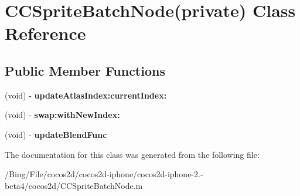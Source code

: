 \hypertarget{interface_c_c_sprite_batch_node_07private_08}{\section{C\-C\-Sprite\-Batch\-Node(private) Class Reference}
\label{interface_c_c_sprite_batch_node_07private_08}
}
\subsection*{Public Member Functions}
\begin{DoxyCompactItemize}
\item 
\hypertarget{interface_c_c_sprite_batch_node_07private_08_aa3c46c384a730981924ee1bb6cf236c3}{(void) -\/ {\bfseries update\-Atlas\-Index\-:current\-Index\-:}}\label{interface_c_c_sprite_batch_node_07private_08_aa3c46c384a730981924ee1bb6cf236c3}

\item 
\hypertarget{interface_c_c_sprite_batch_node_07private_08_a334a5bb674597dad0824078c3227761f}{(void) -\/ {\bfseries swap\-:with\-New\-Index\-:}}\label{interface_c_c_sprite_batch_node_07private_08_a334a5bb674597dad0824078c3227761f}

\item 
\hypertarget{interface_c_c_sprite_batch_node_07private_08_ad0d2d0d578aa30ca5ce76170da5cb06c}{(void) -\/ {\bfseries update\-Blend\-Func}}\label{interface_c_c_sprite_batch_node_07private_08_ad0d2d0d578aa30ca5ce76170da5cb06c}

\end{DoxyCompactItemize}


The documentation for this class was generated from the following file\-:\begin{DoxyCompactItemize}
\item 
/\-Bing/\-File/cocos2d/cocos2d-\/iphone/cocos2d-\/iphone-\/2.-\/beta4/cocos2d/C\-C\-Sprite\-Batch\-Node.\-m\end{DoxyCompactItemize}
